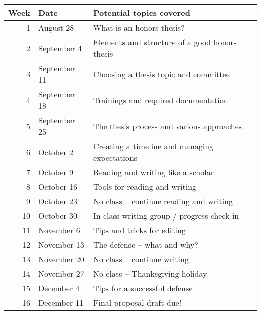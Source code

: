 \documentclass[10pt]{article}
\begin{document}
\begin{center}
\begin{tabular}{rll}
Week & Date & Potential topics covered\\[0pt]
\hline
1 & August 28 & What is an honors thesis?\\[0pt]
2 & September 4 & Elements and structure of a good honors thesis\\[0pt]
3 & September 11 & Choosing a thesis topic and committee\\[0pt]
4 & September 18 & Trainings and required documentation\\[0pt]
5 & September 25 & The thesis process and various approaches\\[0pt]
6 & October 2 & Creating a timeline and managing expectations\\[0pt]
7 & October 9 & Reading and writing like a scholar\\[0pt]
8 & October 16 & Tools for reading and writing\\[0pt]
9 & October 23 & No class -- continue reading and writing\\[0pt]
10 & October 30 & In class writing group / progress check in\\[0pt]
11 & November 6 & Tips and tricks for editing\\[0pt]
12 & November 13 & The defense -- what and why?\\[0pt]
13 & November 20 & No class -- continue writing\\[0pt]
14 & November 27 & No class -- Thanksgiving holiday\\[0pt]
15 & December 4 & Tips for a successful defense\\[0pt]
16 & December 11 & Final proposal draft due!\\[0pt]
\end{tabular}
\end{center}
\end{document}
